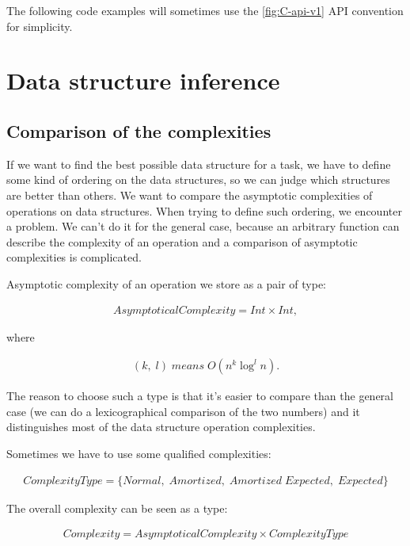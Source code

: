 \documentclass[a4paper,11pt]{article}
\begin{document}
        The following code examples will sometimes use the \autoref{fig:C-api-v1} API convention for simplicity.

\section{Data structure inference}

	\subsection{Comparison of the complexities}

		If we want to find the best possible data structure for a task, we have to define some kind of ordering
		on the data structures, so we can judge which structures are better than others.  We want to compare the
		asymptotic complexities of operations on data structures. When trying to define such ordering, we
		encounter a problem.  We can't do it for the general case, because an arbitrary function can describe
		the complexity of an operation and a comparison of asymptotic complexities is complicated.

		Asymptotic complexity of an operation we store as a pair of type:

		\begin{eqnarray}
			AsymptoticalComplexity = Int \times Int,
		\end{eqnarray}

		where

		\begin{eqnarray}
			(k, \; l) \; means \; O(n^k \log^l{ n}).
		\end{eqnarray}

		The reason to choose such a type is that it's easier to compare than the general case (we can do a
		lexicographical comparison of the two numbers) and it distinguishes most of the data structure operation
		complexities.

		Sometimes we have to use some qualified complexities:

		\begin{eqnarray}
			ComplexityType = \{ Normal, \; Amortized, \; Amortized \;Expected, \; Expected \}
		\end{eqnarray}

		The overall complexity can be seen as a type:

		\begin{eqnarray}
			Complexity = AsymptoticalComplexity \times ComplexityType
		\end{eqnarray}
\end{document}
